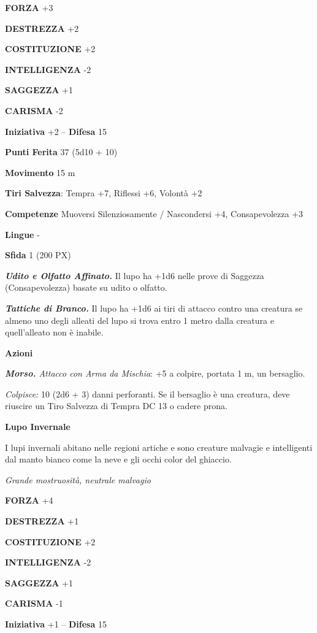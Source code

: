 \begin{multicols}{2}
	\textbf{FORZA} +3

	\textbf{DESTREZZA} +2

	\textbf{COSTITUZIONE} +2

	\textbf{INTELLIGENZA} -2

	\textbf{SAGGEZZA} +1

	\textbf{CARISMA} -2

	\textbf{Iniziativa} +2 -- \textbf{Difesa} 15

	\textbf{Punti Ferita} 37 (5d10 + 10)

	\textbf{Movimento} 15 m

	\textbf{Tiri Salvezza}: Tempra +7, Riflessi +6, Volontà +2

	\textbf{Competenze} Muoversi Silenziosamente / Nascondersi +4, Consapevolezza +3

	\textbf{Lingue} -

	\textbf{Sfida} 1 (200 PX)

	\textit{\textbf{Udito e Olfatto Affinato.}} Il lupo ha +1d6 nelle prove di Saggezza (Consapevolezza) basate su udito o olfatto.

	\textit{\textbf{Tattiche di Branco.}} Il lupo ha +1d6 ai tiri di attacco contro una creatura se almeno uno degli alleati del lupo si trova entro 1 metro dalla creatura e quell'alleato non è inabile.

	\textbf{Azioni}

	\textit{\textbf{Morso.} Attacco con Arma da Mischia}: +5 a colpire, portata 1 m, un bersaglio.

	\textit{Colpisce:} 10 (2d6 + 3) danni perforanti. Se il bersaglio è una creatura, deve riuscire un Tiro Salvezza di Tempra DC 13 o cadere prona.

	\medskip\textbf{Lupo Invernale}

	I lupi invernali abitano nelle regioni artiche e sono creature malvagie e intelligenti dal manto bianco come la neve e gli occhi color del ghiaccio.

	\textit{Grande mostruosità, neutrale malvagio}

	\textbf{FORZA} +4

	\textbf{DESTREZZA} +1

	\textbf{COSTITUZIONE} +2

	\textbf{INTELLIGENZA} -2

	\textbf{SAGGEZZA} +1

	\textbf{CARISMA} -1

	\textbf{Iniziativa} +1 -- \textbf{Difesa} 15


\end{multicols}
